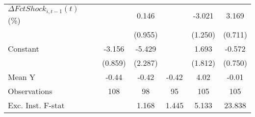 {\begin{tabular}{l*{5}{c}}
\addlinespace
$ \Delta FctShock_{i,t-1}(t)$ (\%)&                     &       0.146         &                     &      -3.021\sym{**} &       3.169\sym{***}\\
                    &                     &     (0.955)         &                     &     (1.250)         &     (0.711)         \\
\addlinespace
Constant            &      -3.156\sym{***}&      -5.429\sym{**} &                     &       1.693         &      -0.572         \\
                    &     (0.859)         &     (2.287)         &                     &     (1.812)         &     (0.750)         \\
\midrule
Mean Y              &       -0.44         &       -0.42         &       -0.42         &        4.02         &       -0.01         \\
Observations        &         108         &          98         &          95         &         105         &         105         \\
Exc. Inst. F-stat   &                     &       1.168         &       1.445         &       5.133         &      23.838         \\
\bottomrule
\end{tabular}
}
